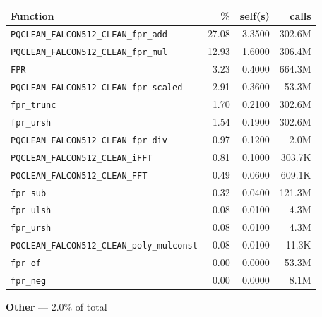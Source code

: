\documentclass[11pt,a4paper]{article}
\begin{document}
\begin{longtable}{p{7.5cm}rrr}
\toprule
Function & \% & self(s) & calls \\
\midrule
\endhead
  \texttt{PQCLEAN\_FALCON512\_CLEAN\_fpr\_add} & 27.08 & 3.3500 & 302.6M \\
  \texttt{PQCLEAN\_FALCON512\_CLEAN\_fpr\_mul} & 12.93 & 1.6000 & 306.4M \\
  \texttt{FPR} & 3.23 & 0.4000 & 664.3M \\
  \texttt{PQCLEAN\_FALCON512\_CLEAN\_fpr\_scaled} & 2.91 & 0.3600 & 53.3M \\
  \texttt{fpr\_trunc} & 1.70 & 0.2100 & 302.6M \\
  \texttt{fpr\_ursh} & 1.54 & 0.1900 & 302.6M \\
  \texttt{PQCLEAN\_FALCON512\_CLEAN\_fpr\_div} & 0.97 & 0.1200 & 2.0M \\
  \texttt{PQCLEAN\_FALCON512\_CLEAN\_iFFT} & 0.81 & 0.1000 & 303.7K \\
  \texttt{PQCLEAN\_FALCON512\_CLEAN\_FFT} & 0.49 & 0.0600 & 609.1K \\
  \texttt{fpr\_sub} & 0.32 & 0.0400 & 121.3M \\
  \texttt{fpr\_ulsh} & 0.08 & 0.0100 & 4.3M \\
  \texttt{fpr\_ursh} & 0.08 & 0.0100 & 4.3M \\
  \texttt{PQCLEAN\_FALCON512\_CLEAN\_poly\_mulconst} & 0.08 & 0.0100 & 11.3K \\
  \texttt{fpr\_of} & 0.00 & 0.0000 & 53.3M \\
  \texttt{fpr\_neg} & 0.00 & 0.0000 & 8.1M \\
\bottomrule
\end{longtable}

\noindent\colorbox{othercolor}{\strut \textbf{Other} --- 2.0\% of total}
\vspace{2pt}
\end{document}
